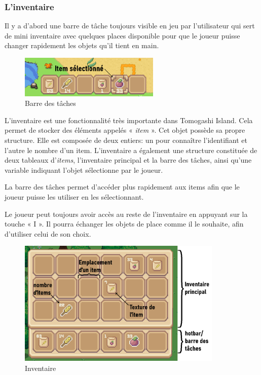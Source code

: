 \documentclass{article}
\begin{document}
        
        \subsubsection{L'inventaire}

        Il y a d'abord une barre de tâche toujours visible en jeu par l'utilisateur qui sert de mini inventaire avec quelques places disponible pour que le joueur puisse changer rapidement les objets qu'il tient en main.

        \begin{figure}[h]  
            \includegraphics[height = 2cm]{hotbar.png}
            \centering
            \caption{Barre des tâches}
            \label{fig:hotbar}
        \end{figure}

        
        
        L'inventaire est une fonctionnalité très importante dans Tomogashi Island. Cela permet de stocker des éléments appelés « \textit{item} ». Cet objet possède sa propre structure. Elle est composée de deux entiers: un pour connaître l'identifiant et l'autre le nombre d'un item.
        L'inventaire a également une structure constituée de deux tableaux d'\textit{items}, l'inventaire principal et la barre des tâches, ainsi qu'une variable indiquant l'objet sélectionne par le joueur.

        La barre des tâches permet d'accéder plus rapidement aux items afin que le joueur puisse les utiliser en les sélectionnant. 

        Le joueur peut toujours avoir accès au reste de l'inventaire en appuyant sur la touche « I ». Il pourra échanger les objets de place comme il le souhaite, afin d'utiliser celui de son choix.

        \begin{figure}[!h]  
            \includegraphics[height = 6cm]{inventory.png}
            \centering
            \caption{Inventaire}
            \label{fig:inventory}
        \end{figure}
\end{document}
